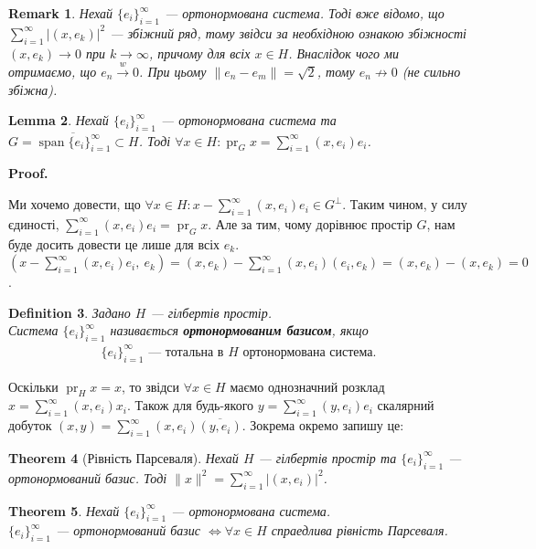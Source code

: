 \documentclass[a4paper, 10pt]{article}
\makeatletter
\theoremstyle{theoremdd}
\newtheorem{theorem}{Theorem}[subsection]
\theoremstyle{theoremdd}
\newtheorem{definition}[theorem]{Definition}
\theoremstyle{theoremdd}
\theoremstyle{theoremdd}
\theoremstyle{theoremdd}
\theoremstyle{theoremdd}
\newtheorem{remark}[theorem]{Remark}
\theoremstyle{theoremdd}
\newtheorem{lemma}[theorem]{Lemma}
\theoremstyle{theoremdd}
\newcommand{\toweak}{\overset{w}{\to}}
\DeclareMathOperator{\pr}{pr}
\renewenvironment{proof}[1][Proof.\\]{\par
\pushQED{\hfill \qed}%
\normalfont \topsep6\p@\@plus6\p@\relax
\trivlist
\item\relax
{\bfseries
#1\@addpunct{.}}\hspace\labelsep\ignorespaces
}{%
\popQED\endtrivlist\@endpefalse
}
\DeclareMathOperator{\linspan}{span}
\makeatother
\begin{document}
\begin{remark}
Нехай $\{e_i\}_{i=1}^\infty$ --- ортонормована система. Тоді вже відомо, що $\displaystyle\sum_{i=1}^\infty |(x,e_k)|^2$ --- збіжний ряд, тому звідси за необхідною ознакою збіжності $(x,e_k) \to 0$ при $k \to \infty$, причому для всіх $x \in H$. Внаслідок чого ми отримаємо, що $e_n \toweak 0$. При цьому $\|e_n - e_m\| = \sqrt{2}$, тому $e_n \not\to 0$ (не сильно збіжна).
\end{remark}

\begin{lemma}
Нехай $\{e_i\}_{i=1}^\infty$ --- ортонормована система та $G = \overline{\linspan\{e_i\}_{i=1}^\infty}\subset H$. Тоді $\forall x \in H: \pr_G x = \displaystyle\sum_{i=1}^\infty (x,e_i)e_i$.
\end{lemma}

\begin{proof}
Ми хочемо довести, що $\forall x \in H: x - \displaystyle\sum_{i=1}^\infty (x,e_i)e_i \in G^\perp$. Таким чином, у силу єдиності, $\displaystyle\sum_{i=1}^\infty (x,e_i)e_i = \pr_G x$. Але за тим, чому дорівнює простір $G$, нам буде досить довести це лише для всіх $e_k$.\\
$\displaystyle\left(x - \sum_{i=1}^\infty (x,e_i)e_i,\ e_k\right) = (x,e_k) - \sum_{i=1}^\infty (x,e_i)(e_i,e_k) = (x,e_k) - (x,e_k) = 0$.
\end{proof}

\begin{definition}
Задано $H$ --- гілбертів простір.\\
Система $\{e_i\}_{i =1}^\infty$ називається \textbf{ортонормованим базисом}, якщо
\begin{align*}
\{e_i\}_{i =1}^\infty \text{ --- тотальна в $H$ ортонормована система}.
\end{align*}
\end{definition}
\noindent
Оскільки $\pr_H x = x$, то звідси $\forall x \in H$ маємо однозначний розклад $x = \displaystyle\sum_{i=1}^\infty (x,e_i)x_i$. Також для будь-якого $y = \displaystyle\sum_{i=1}^\infty (y,e_i)e_i$ скалярний добуток $(x,y) = \displaystyle\sum_{i=1}^\infty (x,e_i)\overline{(y,e_i)}$. Зокрема окремо запишу це:

\begin{theorem}[Рівність Парсеваля]
Нехай $H$ --- гілбертів простір та $\{e_i\}_{i=1}^\infty$ --- ортонормований базис. Тоді $\|x\|^2 = \displaystyle\sum_{i=1}^\infty |(x,e_i)|^2$.
\end{theorem}

\begin{theorem}
Нехай $\{e_i\}_{i=1}^\infty$ --- ортонормована система.\\
$\{e_i\}_{i=1}^\infty$ --- ортонормований базис $\iff \forall x \in H$ спраедлива рівність Парсеваля.
\end{theorem}
\end{document}
